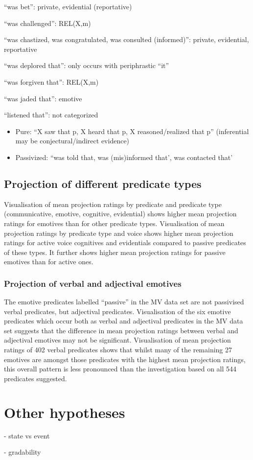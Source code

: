 \documentclass[11pt,fleqn]{article}
\newcommand{\6}{\mbox{$[\hspace*{-.6mm}[$}}
\newcommand{\9}{\mbox{$]\hspace*{-.6mm}]$}}
\begin{document}
\begin{itemize}
\begin{itemize}
``was bet'': private, evidential (reportative)

``was challenged'': REL(X,m)

``was chastized, was congratulated, was consulted (informed)'': private, evidential, reportative

``was deplored that'': only occurs with periphrastic ``it''

``was forgiven that'': REL(X,m)

``was jaded that'': emotive

``listened that'': not categorized

\begin{itemize}

\item Pure: ``X saw that p, X heard that p, X reasoned/realized that p'' (inferential may be conjectural/indirect evidence)

\item Passivized: ``was told that, was (mis)informed that', was contacted that'

\end{itemize}

\end{itemize}

\end{itemize}

\subsection{Projection of different predicate types}

Visualisation of mean projection ratings by predicate and predicate type (communicative, emotive, cognitive, evidential) shows higher mean projection ratings for emotives than for other predicate types. Visualisation of mean projection ratings by predicate type and voice shows higher mean projection ratings for active voice cognitives and evidentials compared to passive predicates of these types. It further shows higher mean projection ratings for passive emotives than for active ones. 

\subsubsection{Projection of verbal and adjectival emotives}

The emotive predicates labelled ``passive'' in the MV data set are not passivised verbal predicates, but adjectival predicates. Visualisation of the six emotive predicates which occur both as verbal and adjectival predicates in the MV data set suggests that the difference in mean projection ratings between verbal and adjectival emotives may not be significant. Visualisation of mean projection ratings of 402 verbal predicates shows that whilst many of the remaining 27 emotives are amongst those predicates with the highest mean projection ratings, this overall pattern is less pronounced than the investigation based on all 544 predicates suggested.

\section{Other hypotheses}


- state vs event

- gradability





\end{document}
